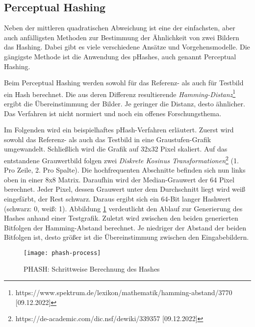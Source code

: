 \subsection{Perceptual Hashing}
Neben der mittleren quadratischen Abweichung ist eine der einfachsten, aber auch
anfälligsten Methoden zur Bestimmung der Ähnlichkeit von zwei Bildern das
Hashing. Dabei gibt es viele verschiedene Ansätze und Vorgehensmodelle. Die
gängigste Methode ist die Anwendung des pHashes, auch genannt Perceptual Hashing.
\parencite{hashing-apiumhub}

Beim Perceptual Hashing werden sowohl für das Referenz- als auch für Testbild
ein Hash berechnet. Die aus deren Differenz resultierende
\textit{Hamming-Distanz}\footnote{https://www.spektrum.de/lexikon/mathematik/hamming-abstand/3770 [09.12.2022]}
ergibt die Übereinstimmung der Bilder. Je geringer die Distanz, desto ähnlicher.
Das Verfahren ist nicht normiert und noch ein offenes Forschungsthema.
\parencite{hashing-phash}

Im Folgenden wird ein beispielhaftes pHash-Verfahren erläutert. Zuerst wird
sowohl das Referenz- als auch das Testbild in eine Graustufen-Grafik
umgewandelt. Schließlich wird die Grafik auf 32x32 Pixel skaliert. Auf das
entstandene Grauwertbild folgen zwei \textit{Diskrete Kosinus Transformationen}\footnote{https://de-academic.com/dic.nsf/dewiki/339357 [09.12.2022]}
(1. Pro Zeile, 2. Pro Spalte). Die hochfrequenten Abschnitte befinden sich nun links
oben in einer 8x8 Matrix. Daraufhin wird der Median-Grauwert der 64 Pixel
berechnet. Jeder Pixel, dessen Grauwert unter dem Durchschnitt liegt wird weiß
eingefärbt, der Rest schwarz. Daraus ergibt sich ein 64-Bit langer Hashwert
(schwarz: 0, weiß: 1). Abbildung \ref{fig:phash-process} verdeutlicht den 
Ablauf zur Generierung des Hashes anhand einer Testgrafik. Zuletzt wird zwischen
den beiden generierten Bitfolgen der Hamming-Abstand berechnet. Je niedriger der
Abstand der beiden Bitfolgen ist, desto größer ist die Übereinstimmung zwischen
den Eingabebildern. \parencite{hashing-apiumhub}

\begin{figure}[H]
    \centering
    \texttt{[image: phash-process]}
    \caption{PHASH: Schrittweise Berechnung des Hashes}
    \label{fig:phash-process}
\end{figure}

